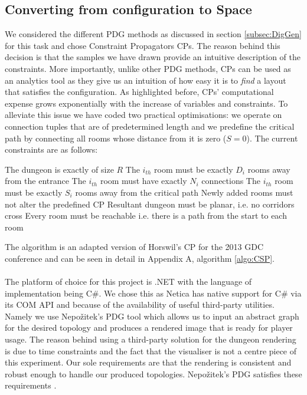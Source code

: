 \documentclass{UoYCSproject}
\begin{document}
\subsection{Converting from configuration to Space}
\label{subsec:CSP}
 We considered the different PDG methods as discussed in section \ref{subsec:DigGen} for this task and chose Constraint Propagators CPs. The reason behind this decision is that the samples we have drawn provide an intuitive description of the constraints. More importantly, unlike other PDG methods, CPs can be used as an analytics tool as they give us an intuition of how easy it is to \textit{find} a layout that satisfies the configuration. As highlighted before, CPs' computational expense grows exponentially with the increase of variables and constraints. To alleviate this issue we have coded two practical optimisations: we operate on connection tuples that are of predetermined length and we predefine the critical path by connecting all rooms whose distance from it is zero (\(S = 0\)). The current constraints are as follows:
\begin{outline}[enumerate]
  \1 The dungeon is exactly of size \(R\)
  \1 The \(i_{th}\) room must be exactly \(D_i\) rooms away from the entrance
  \1 The \(i_{th}\) room must have exactly \(N_i\) connections 
  \1 The \(i_{th}\) room must be exactly \(S_i\) rooms away from the critical path
  \1 Newly added rooms must not alter the predefined CP
  \1 Resultant dungeon must be planar, i.e. no corridors cross
  \1 Every room must be reachable i.e. there is a path from the start to each room
\end{outline}

The algorithm is an adapted version of Horswil's CP for the 2013 GDC conference \parencite{HorswillCPInAWeekend} and can be seen in detail in Appendix A, algorithm \ref{algo:CSP}.

\paragraph{}
The platform of choice for this project is .NET with the language of implementation being C\#. We chose this as Netica has native support for C\# via its COM API and because of the availability of useful third-party utilities. Namely we use Nepo\v{z}itek's PDG tool \parencite{levelGenerator} which allows us to input an abstract graph for the desired topology and produces a rendered image that is ready for player usage. The reason behind using a third-party solution for the dungeon rendering is due to time constraints and the fact that the visualiser is not a centre piece of this experiment. Our sole requirements are that the rendering is consistent and robust enough to handle our produced topologies. Nepo\v{z}itek's PDG satisfies these requirements \parencite{Nepozitek2018FASTCT}.
\end{document}
